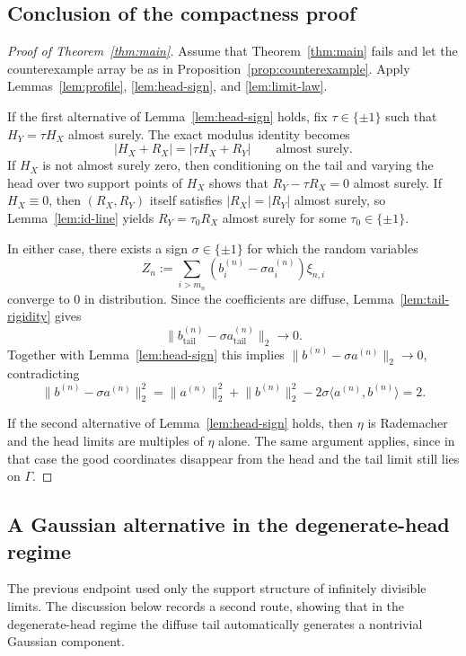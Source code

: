 \documentclass[11pt]{amsart}
\numberwithin{equation}{section}
\theoremstyle{definition}
\theoremstyle{remark}
\newcommand{\abs}[1]{\lvert #1 \rvert}
\newcommand{\norm}[1]{\lVert #1 \rVert}
\newcommand{\ip}[2]{\langle #1,#2\rangle}
\begin{document}
\subsection{Conclusion of the compactness proof}

\begin{proof}[Proof of Theorem~\ref{thm:main}]
Assume that Theorem~\ref{thm:main} fails and let the counterexample array be as
in Proposition~\ref{prop:counterexample}.  Apply
Lemmas~\ref{lem:profile}, \ref{lem:head-sign}, and \ref{lem:limit-law}.

If the first alternative of Lemma~\ref{lem:head-sign} holds, fix
$\tau\in\{\pm1\}$ such that $H_Y=\tau H_X$ almost surely.  The exact modulus
identity becomes
\[
\abs{H_X+R_X}=\abs{\tau H_X+R_Y}
\qquad\text{almost surely.}
\]
If $H_X$ is not almost surely zero, then conditioning on the tail and varying
the head over two support points of $H_X$ shows that
$R_Y-\tau R_X=0$ almost surely.  If $H_X\equiv0$, then
$(R_X,R_Y)$ itself satisfies $\abs{R_X}=\abs{R_Y}$ almost surely, so
Lemma~\ref{lem:id-line} yields
$R_Y=\tau_0 R_X$ almost surely for some $\tau_0\in\{\pm1\}$.

In either case, there exists a sign $\sigma\in\{\pm1\}$ for which the random variables
\[
Z_n:=\sum_{i>m_n}(b_i^{(n)}-\sigma a_i^{(n)})\xi_{n,i}
\]
converge to $0$ in distribution.  Since the coefficients are diffuse,
Lemma~\ref{lem:tail-rigidity} gives
\[
\norm{b_{\mathrm{tail}}^{(n)}-\sigma a_{\mathrm{tail}}^{(n)}}_2\to0.
\]
Together with Lemma~\ref{lem:head-sign} this implies
$\norm{b^{(n)}-\sigma a^{(n)}}_2\to0$, contradicting
\[
\norm{b^{(n)}-\sigma a^{(n)}}_2^2
=\norm{a^{(n)}}_2^2+\norm{b^{(n)}}_2^2
-2\sigma\ip{a^{(n)}}{b^{(n)}}=2.
\]

If the second alternative of Lemma~\ref{lem:head-sign} holds, then
$\eta$ is Rademacher and the head limits are multiples of $\eta$ alone.  The
same argument applies, since in that case the good coordinates disappear from
the head and the tail limit still lies on $\Gamma$.
\end{proof}

\subsection{A Gaussian alternative in the degenerate-head regime}\label{ssec:gaussian-alt}

The previous endpoint used only the support structure of infinitely divisible
limits.  The discussion below records a second route, showing that in the degenerate-head regime the
diffuse tail automatically generates a nontrivial Gaussian component.
\end{document}
